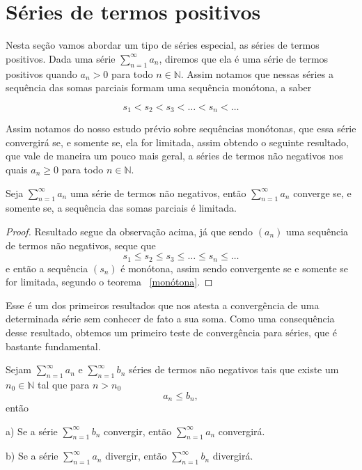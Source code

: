 \section{Séries de termos positivos}
\construirSec

Nesta seção vamos abordar um tipo de séries especial, as séries de termos 
positivos. Dada uma série $\sum_{n = 1}^{\infty} a_n$, diremos que ela é uma
série de termos positivos quando $a_n > 0$ para todo $n \in \mathbb{N}$. Assim
notamos que nessas séries a sequência das somas parciais formam uma sequência
monótona, a saber

$$ s_1 < s_2 < s_3 < \dots < s_n < \dots$$

Assim notamos do nosso estudo prévio sobre sequências monótonas, que essa série
convergirá se, e somente se, ela for limitada, assim obtendo o seguinte resultado,
que vale de maneira um pouco mais geral, a séries de termos não negativos nos
quais $a_n \geq 0$ para todo $n \in \mathbb{N}$.

\begin{teo}\label{séries termos positivos}
    Seja $\sum_{n = 1}^{\infty} a_n$ uma série de termos não negativos, então 
    $\sum_{n = 1}^{\infty} a_n$ converge se, e somente se, a sequência das somas
    parciais é limitada.
\end{teo}

\begin{proof}
    Resultado segue da observação acima, já que sendo $(a_n)$ uma sequência de
    termos não negativos, seque que 
    $$ s_1 \leq s_2 \leq s_3 \leq \dots \leq s_n \leq \dots$$
    e então a sequência $(s_n)$ é monótona, assim sendo convergente se e somente
    se for limitada, segundo o teorema ~\ref{monótona}.
\end{proof}

Esse é um dos primeiros resultados que nos atesta a convergência de uma 
determinada série sem conhecer de fato a sua soma. Como uma consequência desse
resultado, obtemos um primeiro teste de convergência para séries, que é bastante
fundamental.

\begin{teo}\label{comparação}
    Sejam $\sum_{n = 1}^{\infty} a_n$ e $\sum_{n = 1}^{\infty} b_n$ séries de
    termos não negativos tais que existe um $n_0 \in \mathbb{N}$ tal que para
    $n>n_0$
    $$a_n \leq b_n,$$
    então
    \item [a)] Se a série $\sum_{n = 1}^{\infty} b_n$ convergir, então
    $\sum_{n = 1}^{\infty} a_n$ convergirá.
    \item [b)] Se a série $\sum_{n = 1}^{\infty} a_n$ divergir,
    então $\sum_{n = 1}^{\infty} b_n$ divergirá.
\end{teo}

